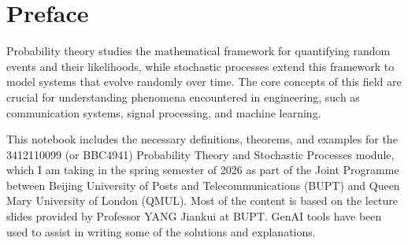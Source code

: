 \chapter*{Preface}

Probability theory studies the mathematical framework for quantifying random events and their likelihoods, while stochastic processes extend this framework to model systems that evolve randomly over time. The core concepts of this field are crucial for understanding phenomena encountered in engineering, such as communication systems, signal processing, and machine learning.

This notebook includes the necessary definitions, theorems, and examples for the 3412110099 (or BBC4941) Probability Theory and Stochastic Processes module, which I am taking in the spring semester of 2026 as part of the Joint Programme between Beijing University of Posts and Telecommunications (BUPT) and Queen Mary University of London (QMUL). Most of the content is based on the lecture slides provided by Professor YANG Jiankui at BUPT. GenAI tools have been used to assist in writing some of the solutions and explanations.

